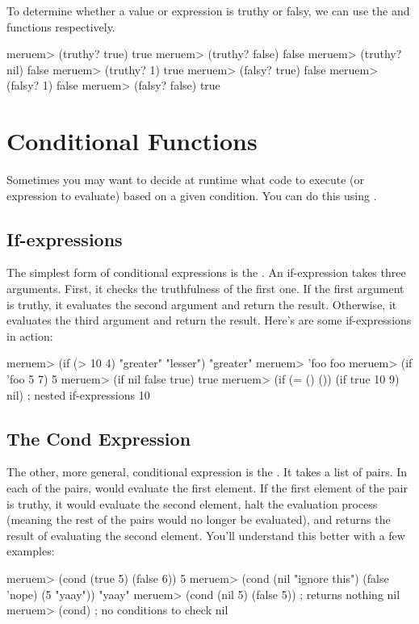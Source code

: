 To determine whether a value or expression is truthy or falsy, we can use the  and  functions respectively.

\begin{REPL}
meruem> (truthy? true)
true
meruem> (truthy? false)
false
meruem> (truthy? nil)
false
meruem> (truthy? 1)
true
meruem> (falsy? true)
false
meruem> (falsy? 1)
false
meruem> (falsy? false)
true
\end{REPL}

\section{Conditional Functions}
Sometimes you may want to decide at runtime what code to execute (or expression to evaluate) based on a given condition. You can do this using . 

\subsection{If-expressions}
The simplest form of conditional expressions is the . An if-expression takes three arguments. First, it checks the truthfulness of the first one. If the first argument is truthy, it evaluates the second argument and return the result. Otherwise, it evaluates the third argument and return the result. Here's are some if-expressions in action:

\begin{REPL}
meruem> (if (> 10 4) "greater" "lesser")
"greater"
meruem> 'foo                   
foo
meruem> (if 'foo 5 7)
5
meruem> (if nil false true)
true
meruem> (if (= () ()) (if true 10 9) nil)  ; nested if-expressions
10
\end{REPL}

\subsection{The Cond Expression}
The other, more general, conditional expression is the . It takes a list of pairs. In each of the pairs,  would evaluate the first element. If the first element of the pair is truthy, it would evaluate the second element, halt the evaluation process (meaning the rest of the pairs would no longer be evaluated), and returns the result of evaluating the second element. You'll understand this better with a few examples:

\begin{REPL}
meruem> (cond (true 5) (false 6))
5
meruem> (cond (nil "ignore this") (false 'nope) (5 "yaay"))
"yaay"
meruem> (cond (nil 5) (false 5))	; returns nothing
nil
meruem> (cond)  ; no conditions to check
nil
\end{REPL}

